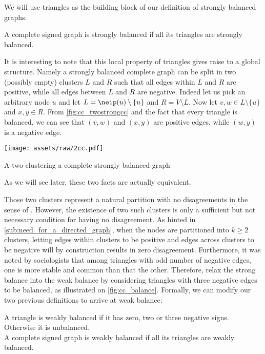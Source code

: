 We will use triangles as the building block of our definition of strongly balanced graphs.
\begin{definition}
	A complete signed graph is strongly balanced if all its triangles are strongly balanced.
\end{definition}

It is interesting to note that this local property of triangles gives raise to a global structure.
Namely a strongly balanced complete graph can be split in two (possibly empty) clusters $L$ and $R$
such that all edges within $L$ and $R$ are positive, while all edges between $L$ and $R$ are
negative. Indeed let us pick an arbitrary node $u$ and let $L=\neip(u)\setminus \{u\}$ and $R=V\setminus L$. Now
let $v,w\in L\setminus \{u\}$ and $x,y\in R$. From \autoref{fig:cc_twostrongcc} and the fact that
every triangle is balanced, we can see that $(v,w)$ and $(x,y)$ are positive edges, while $(w,y)$ is
a negative edge.
\begin{marginfigure}
  \centering
  \texttt{[image: assets/raw/2cc.pdf]}
  \caption{A two-clustering a complete strongly balanced graph}
  \label{fig:cc_twostrongcc}
\end{marginfigure}
As we will see later, these two facts are actually equivalent.

Those two clusters represent a natural partition with no disagreements in the sense of \pcc{}. However,
the existence of two such clusters is only a sufficient but not necessary condition for having no
disagreement. As hinted in \autoref{sub:need_for_a_directed_graph}, when the nodes are partitioned
into $k\geq 2$ clusters, letting edges within clusters to be positive and edges across clusters to
be negative will by construction results in zero disagreement. Furthermore, it was noted by
sociologists that among triangles with odd number of negative edges, one is more stable and common
than that the other. Therefore, \textcite{davis1967clustering} relax the strong balance into the
weak balance by considering triangles with three negative edges to be balanced, as illustrated on
\autoref{fig:cc_balance}. Formally, we can modify our two previous definitions to arrive at weak
balance:
\begin{definition}
	A triangle is weakly balanced if it has zero, two or three negative signs. Otherwise it is
	unbalanced. \\
	A complete signed graph is weakly balanced if all its triangles are weakly balanced.
\end{definition}

